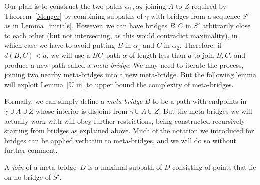 \documentclass[a4paper]{article}
\newcommand{\defi}[1]{{\color{darkgray}\emph{#1}}}
\newcommand{\pth}[2]{\ensuremath{#1}\text{--}\ensuremath{#2}~path}
\newcommand{\Lr}[1]{Lemma~\ref{#1}}
\newcommand{\Tr}[1]{Theorem~\ref{#1}}
\newcommand{\mb}{meta-bridge}
\begin{document}
Our plan is to construct the two paths $\alpha_1,\alpha_2$ joining $A$ to $Z$ required by \Tr{Menger} by combining subpaths of $\gamma$ with bridges from a sequence $S'$ as in \Lr{initials}. However, we can have bridges $B,C$ in $S'$ arbitrarily close to each other (but not intersecting, as this would contradict maximality), in which case we have to avoid putting $B$ in $\alpha_1$ and $C$ in $\alpha_2$. Therefore, if $d(B,C)<a$, we will use a \pth{B}{C} $\alpha$ of length less than $a$ to join $B,C$, and produce a new path called a \defi{\mb}. We may need to iterate the process, joining two nearby \mb s into a new \mb. But the following lemma will exploit \Lr{U iii} to upper bound the complexity of \mb s. 

Formally, we can simply define a \defi{\mb} $B$ to be a path
with endpoints in $\gamma \cup A \cup Z$ whose interior is disjoint from $\gamma \cup A \cup Z$. But the \mb s we will actually work with will obey further restrictions, being constructed recursively starting from bridges as explained above. Much of the notation we introduced for bridges can be applied verbatim to \mb s, and we will do so without further comment.

A \defi{join} of a \mb\ $D$ is a maximal subpath of $D$ consisting of points that lie on no bridge of $S'$. 
\end{document}
